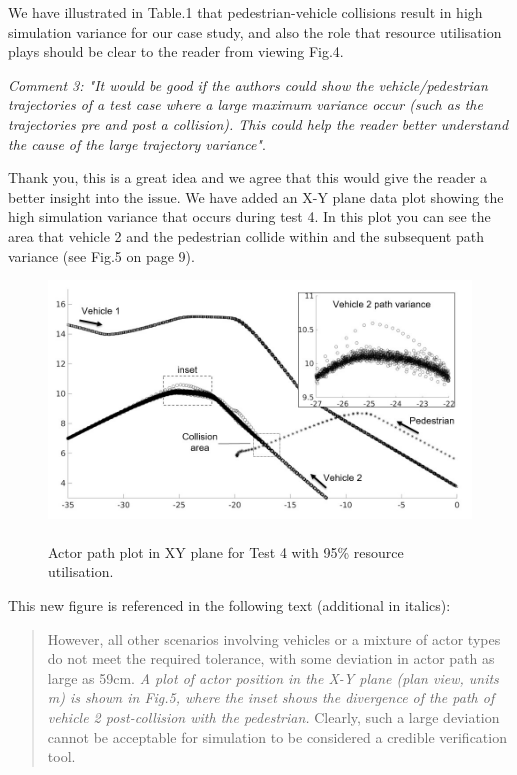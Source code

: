 \documentclass[11pt, a4paper]{letter} %
\begin{document}
\begin{letter}
We have illustrated in Table.1 that pedestrian-vehicle collisions result in high simulation variance for our case study, and also the role that resource utilisation plays should be clear to the reader from viewing Fig.4. 


\bigskip

\textit{Comment 3: "It would be good if the authors could show the vehicle/pedestrian trajectories of a test case where a large maximum variance occur (such as the trajectories pre and post a collision). This could help the reader better understand the cause of the large trajectory variance"}.

Thank you, this is a great idea and we agree that this would give the reader a better insight into the issue. We have added an X-Y plane data plot showing the high simulation variance that occurs during test 4. In this plot you can see the area that vehicle 2 and the pedestrian collide within and the subsequent path variance (see Fig.5 on page 9). 

\begin{figure}
    \centering
    \includegraphics[width=12cm]{../document/other/figures/actor_path_plot.jpg}
    \caption{\\Actor path plot in XY plane for Test 4 with 95\% resource utilisation.}
\end{figure}


This new figure is referenced in the following text (additional in italics):
\begin{quote}
However, all other scenarios involving vehicles or a mixture of actor types do not meet the required tolerance, with some deviation in actor path as large as 59cm. \textit{A plot of actor position in the X-Y plane (plan view, units m) is shown in Fig.5, where the inset shows the divergence of the path of vehicle 2 post-collision with the pedestrian.} Clearly, such a large deviation cannot be acceptable for simulation to be considered a credible verification tool.
\end{quote}


\end{letter}
\end{document}
